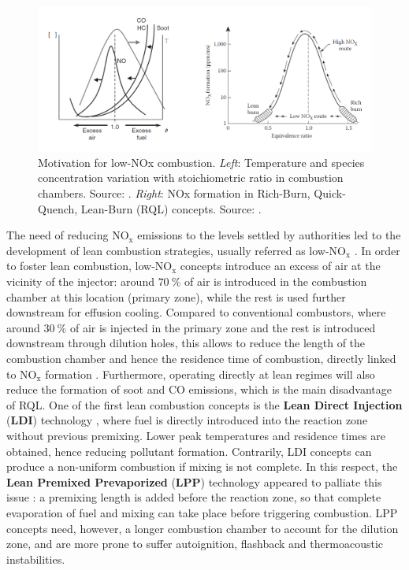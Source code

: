 \begin{figure}[h!]
	\centering
	\includegraphics[scale=0.65]{./part0_intro/NOX_motivation_and_RQL}
	\caption[Motivation for low-NOx combustion]{Motivation for low-NOx combustion. \textsl{Left}: Temperature and species concentration variation with stoichiometric ratio in combustion chambers. Source: . \textsl{Right}: NOx formation in Rich-Burn, Quick-Quench, Lean-Burn (RQL) concepts. Source: .}
	\label{fig:NOX_motivation_and_RQL}
\end{figure}

The need of reducing NO$_\mathrm{x}$ emissions to the levels settled by authorities led to the development of lean combustion strategies, usually referred as low-NO$_\mathrm{x}$ . In order to foster lean combustion, low-NO$_\mathrm{x}$ concepts introduce an excess of air at the vicinity of the injector: around $70 ~\%$ of air is introduced in the combustion chamber at this location (primary zone), while the rest is used further downstream for effusion cooling. Compared to conventional combustors, where around $30 ~\%$ of air is injected in the primary zone and the rest is introduced downstream through dilution holes, this allows to reduce the length of the combustion chamber and hence the residence time of combustion, directly linked to NO$_\mathrm{x}$ formation . Furthermore, operating directly at lean regimes will also reduce the formation of soot and CO emissions, which is the main disadvantage of RQL. One of the first lean combustion concepts is the \textbf{Lean Direct Injection} (\textbf{LDI}) technology , where fuel is directly introduced into the reaction zone without previous premixing. Lower peak temperatures and residence times are obtained, hence reducing pollutant formation. Contrarily, LDI concepts can produce a non-uniform combustion if mixing is not complete. In this respect, the \textbf{Lean Premixed Prevaporized} (\textbf{LPP}) technology appeared to palliate this issue : a premixing length is added before the reaction zone, so that complete evaporation of fuel and mixing can take place before triggering combustion. LPP concepts need, however, a longer combustion chamber to account for the dilution zone, and are more prone to suffer autoignition, flashback and thermoacoustic instabilities.


